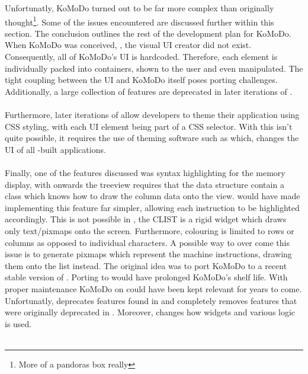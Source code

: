 \graphicspath{ {images/impl/} }
  Unfortunatly, KoMoDo turned out to be far more complex than originally thought\footnote{More of a pandoras box really}. Some of the issues encountered are discussed further within this section. The conclusion outlines the rest of the development plan for KoMoDo.
    When KoMoDo was conceived, , the visual UI creator did not exist. Consequently, all of KoMoDo's UI is hardcoded. Therefore, each element is individually packed into containers, shown to the user and even manipulated. The tight coupling between the UI and KoMoDo itself poses porting challenges. Additionally, a large collection of features are deprecated in later iterations of .\\\\
    Furthermore, later iterations of  allow developers to theme their application using CSS styling, with each UI element being part of a CSS selector. With  this isn't quite possible, it requires the use of theming software such as  which, changes the UI of all -built applications.\\\\
    Finally, one of the features discussed was syntax highlighting for the memory display, with  onwards the treeview requires that the data structure contain a class which knows how to draw the column data onto the view.  would have made implementing this feature far simpler, allowing each instruction to be highlighted accordingly. This is not possible in , the CLIST is a rigid widget which draws only text/pixmaps onto the screen. Furthermore, colouring is limited to rows or columns as opposed to individual characters. A possible way to over come this issue is to generate pixmaps which represent the machine instructions, drawing them onto the list instead.
    The original idea was to port KoMoDo to a recent stable version of . Porting to  would have prolonged KoMoDo's shelf life. With proper maintenance KoMoDo on  could have been kept relevant for years to come. Unfortunatly,  deprecates features found in  and completely removes features that were originally deprecated in . Moreover,  changes how widgets and various logic is used.\\\\
